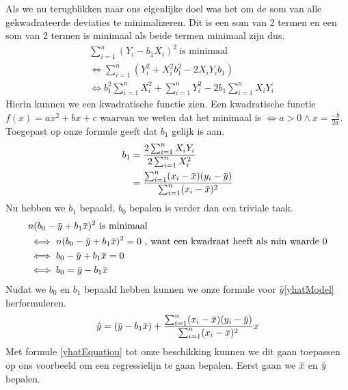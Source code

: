 \documentclass[11pt]{report}
\newcommand{\overbar}[1]{\mkern 1.5mu\overline{\mkern-1.5mu#1\mkern-1.5mu}\mkern 1.5mu}
\newcommand{\pbr}{\hfill\break\hfill\break}
\begin{document}
Als we nu terugblikken naar ons eigenlijke doel was het om de som van alle gekwadrateerde deviaties te minimalizeren. Dit is een som van 2 termen en een som van 2 termen is minimaal als beide termen minimaal zijn dus.
\begin{equation*}
  \begin{split}
    &\sum_{i=1}^n(Y_i - b_1X_i)^2\ \text{is minimaal}\\
    &\iff \sum_{i=1}^n(Y_i^2 + X_i^2b_1^2 - 2X_iY_ib_1)\\
    &\iff b_1^2\sum_{i=1}^nX_i^2 + \sum_{i=1}^nY_i^2 - 2b_1\sum_{i=1}^nX_iY_i
  \end{split}
\end{equation*}
Hierin kunnen we een kwadratische functie zien. Een kwadratische functie $f(x) = ax^2 + bx + c$ waarvan we weten dat het minimaal is $\iff a > 0 \wedge x = \frac{-b}{2a}$. Toegepast op onze formule geeft dat $b_1$ gelijk is aan.
\begin{equation*}
  \begin{split}
    b_1 &= \frac{2\sum_{i=1}^nX_iY_i}{2\sum_{i=1}^nX_i^2}\\
    &= \frac{\sum_{i=1}^n(x_i - \overbar{x})(y_i - \overbar{y})}{\sum_{i=1}^n(x_i - \overbar{x})^2}
  \end{split}
\end{equation*}
Nu hebben we $b_1$ bepaald, $b_0$ bepalen is verder dan een triviale taak.
\begin{equation*}
  \begin{split}
    &n(b_0- \overbar{y} + b_1\overbar{x})^2\ \text{is minimaal}\\
    &\iff n(b_0 - \overbar{y} + b_1\overbar{x})^2 = 0\ \text{, want een kwadraat heeft als min waarde 0}\\
    &\iff b_0 - \overbar{y} + b_1\overbar{x} = 0\\
    &\iff b_0 = \overbar{y} - b_1\overbar{x}
  \end{split}
\end{equation*}
Nudat we $b_0$ en $b_1$ bepaald hebben kunnen we onze formule voor $\hat{y}$\ref{yhatModel} herformuleren.
\begin{equation}
  \hat{y} = (\overbar{y} - b_1\overbar{x}) + \frac{\sum_{i=1}^n(x_i - \overbar{x})(y_i - \overbar{y})}{\sum_{i=1}^n(x_i - \overbar{x})^2}x
  \label{yhatEquation}
\end{equation}
Met formule \ref{yhatEquation} tot onze beschikking kunnen we dit gaan toepassen op ons voorbeeld om een regressielijn te gaan bepalen.
\pbr
Eerst gaan we $\overbar{x}$ en $\overbar{y}$ bepalen.
\end{document}
